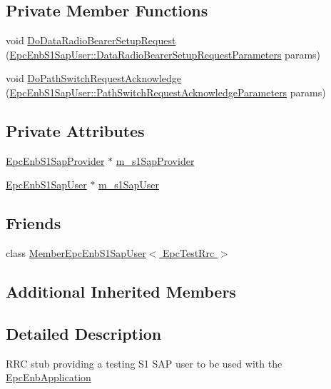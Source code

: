 \subsection*{Private Member Functions}
\begin{DoxyCompactItemize}
\item 
void \hyperlink{classns3_1_1EpcTestRrc_ae95a6e821405d16375029f4f05df2a86}{Do\+Data\+Radio\+Bearer\+Setup\+Request} (\hyperlink{structns3_1_1EpcEnbS1SapUser_1_1DataRadioBearerSetupRequestParameters}{Epc\+Enb\+S1\+Sap\+User\+::\+Data\+Radio\+Bearer\+Setup\+Request\+Parameters} params)
\item 
void \hyperlink{classns3_1_1EpcTestRrc_a6b6cec1b5214b654ed23d27f2cfd0a1c}{Do\+Path\+Switch\+Request\+Acknowledge} (\hyperlink{structns3_1_1EpcEnbS1SapUser_1_1PathSwitchRequestAcknowledgeParameters}{Epc\+Enb\+S1\+Sap\+User\+::\+Path\+Switch\+Request\+Acknowledge\+Parameters} params)
\end{DoxyCompactItemize}
\subsection*{Private Attributes}
\begin{DoxyCompactItemize}
\item 
\hyperlink{classns3_1_1EpcEnbS1SapProvider}{Epc\+Enb\+S1\+Sap\+Provider} $\ast$ \hyperlink{classns3_1_1EpcTestRrc_aae04ef2c88c257a8dcf3555cd8f47ba3}{m\+\_\+s1\+Sap\+Provider}
\item 
\hyperlink{classns3_1_1EpcEnbS1SapUser}{Epc\+Enb\+S1\+Sap\+User} $\ast$ \hyperlink{classns3_1_1EpcTestRrc_a00ff3faa8077cb08667d55f4f4b42a20}{m\+\_\+s1\+Sap\+User}
\end{DoxyCompactItemize}
\subsection*{Friends}
\begin{DoxyCompactItemize}
\item 
class \hyperlink{classns3_1_1EpcTestRrc_a5f7588bb3f7c4169a1679cd52b272cfd}{Member\+Epc\+Enb\+S1\+Sap\+User$<$ Epc\+Test\+Rrc $>$}
\end{DoxyCompactItemize}
\subsection*{Additional Inherited Members}


\subsection{Detailed Description}
R\+RC stub providing a testing S1 S\+AP user to be used with the \hyperlink{classns3_1_1EpcEnbApplication}{Epc\+Enb\+Application} 

